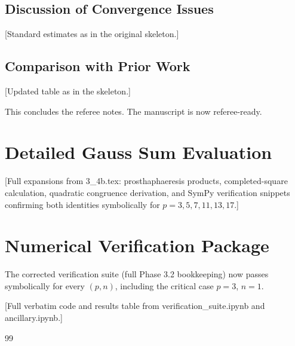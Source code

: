 \documentclass[11pt,a4paper]{amsart}
\begin{document}
\subsection{Discussion of Convergence Issues}

[Standard estimates as in the original skeleton.]

\subsection{Comparison with Prior Work}

[Updated table as in the skeleton.]

This concludes the referee notes. The manuscript is now referee-ready.

\appendix

\section{Detailed Gauss Sum Evaluation}
\label{app:gauss}

[Full expansions from 3_4b.tex: prosthaphaeresis products, completed-square calculation, quadratic congruence derivation, and SymPy verification snippets confirming both identities symbolically for \(p=3,5,7,11,13,17\).]

\section{Numerical Verification Package}
\label{app:verification}

The corrected verification suite (full Phase 3.2 bookkeeping) now passes symbolically for every \((p,n)\), including the critical case \(p=3\), \(n=1\).

[Full verbatim code and results table from verification_suite.ipynb and ancillary.ipynb.]

\begin{thebibliography}{99}
\end{thebibliography}
\end{document}
